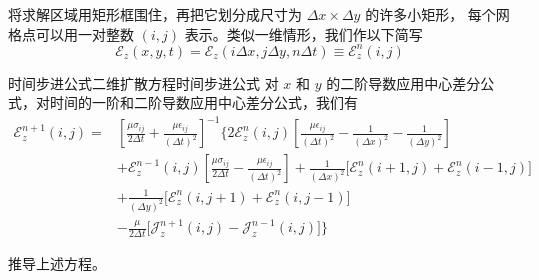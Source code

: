 \begin{definition}
    将求解区域用矩形框围住，再把它划分成尺寸为 $\Delta x \times \Delta y$ 的许多小矩形，
    每个网格点可以用一对整数 $(i,j)$ 表示。类似一维情形，我们作以下简写
    \begin{equation}
        \mathscr{E}_z(x,y,t)=\mathscr{E}_z(i\Delta x,j\Delta y,n\Delta t)
        \equiv \mathscr{E}_z^n(i,j)
    \end{equation}
\end{definition}

\begin{theorem}{时间步进公式}{二维扩散方程时间步进公式}
    对 $x$ 和 $y$ 的二阶导数应用中心差分公式，对时间的一阶和二阶导数应用中心差分公式，我们有
    \begin{equation}
        \begin{aligned}
            \mathscr{E}_z^{n+1}(i,j)=
            &\left[\frac{\mu\sigma_{ij}}{2\Delta t}+\frac{\mu\epsilon_{ij}}{(\Delta t)^2}\right]^{-1}
            \Bigg\{2\mathscr{E}_z^n(i,j)\left[
                \frac{\mu\epsilon_{ij}}{(\Delta t)^2}
                -\frac{1}{(\Delta x)^2}-\frac{1}{(\Delta y)^2}
            \right]\\
            &+\mathscr{E}_z^{n-1}(i,j)\left[
                \frac{\mu\sigma_{ij}}{2\Delta t}-\frac{\mu\epsilon_{ij}}{(\Delta t)^2}
            \right]
            +\frac{1}{(\Delta x)^2}\Big[\mathscr{E}_z^{n}(i+1,j)+\mathscr{E}_z^{n}(i-1,j)\Big]\\
            &+\frac{1}{(\Delta y)^2}\Big[\mathscr{E}_z^{n}(i,j+1)+\mathscr{E}_z^{n}(i,j-1)\Big]\\
            &-\frac{\mu}{2\Delta t}\Big[\mathscr{J}_z^{n+1}(i,j)-\mathscr{J}_z^{n-1}(i,j)\Big]\Bigg\}
        \end{aligned}
    \end{equation}
\end{theorem}

\begin{exercise}
    推导上述方程。
\end{exercise}

